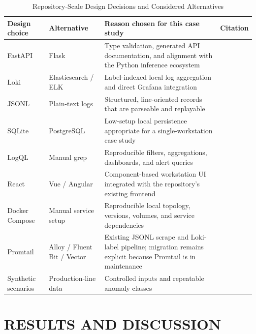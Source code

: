 \documentclass[12pt,a4paper]{article}
\begin{document}
\begin{table}[!ht]
\centering
\small
\caption{Repository-Scale Design Decisions and Considered Alternatives}
\label{tab:design_decisions}
\begin{tabular}{p{} p{} p{} p{}}
\toprule
\textbf{Design choice} & \textbf{Alternative} & \textbf{Reason chosen for this case study} & \textbf{Citation} \\
\midrule
FastAPI & Flask & Type validation, generated API documentation, and alignment with the Python inference ecosystem & \cite{fastapi,techempower} \\
Loki & Elasticsearch / ELK & Label-indexed local log aggregation and direct Grafana integration & \cite{lokiarch} \\
JSONL & Plain-text logs & Structured, line-oriented records that are parseable and replayable & \cite{twelvefactor} \\
SQLite & PostgreSQL & Low-setup local persistence appropriate for a single-workstation case study & \cite{gaffney2022sqlite} \\
LogQL & Manual grep & Reproducible filters, aggregations, dashboards, and alert queries & \cite{loki} \\
React & Vue / Angular & Component-based workstation UI integrated with the repository's existing frontend & \cite{reactdocs} \\
Docker Compose & Manual service setup & Reproducible local topology, versions, volumes, and service dependencies & \cite{merkel2014docker,bernstein2014containers} \\
Promtail & Alloy / Fluent Bit / Vector & Existing JSONL scrape and Loki-label pipeline; migration remains explicit because Promtail is in maintenance & \cite{alloydocs} \\
Synthetic scenarios & Production-line data & Controlled inputs and repeatable anomaly classes & \cite{paleyes2022challenges} \\
\bottomrule
\end{tabular}
\end{table}


\section{RESULTS AND DISCUSSION}
\end{document}
